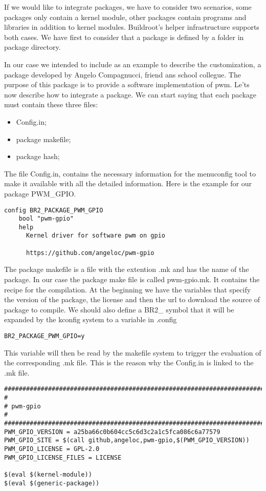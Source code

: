 \documentclass[a4paper,twoside,11pt]{article}
\begin{document}
If we would like to integrate packages,
we have to consider two scenarios, some packages only contain a kernel module, other packages contain programs and libraries in addition to kernel modules. 
Buildroot's helper infrastructure supports both cases.
We have first to consider that a package is defined by a folder in package directory.


In our case we intended to include as an example to describe the customization, a package developed by Angelo Compagnucci, friend ans school collegue.
The purpose of this package is to provide a software implementation of pwm.
Le'ts now describe how to integrate a package.
We can start saying that each package must contain these three files:
\begin{itemize}
\item Config.in;
\item package makefile;
\item package hash;
\end{itemize}
The file Config.in, contains the necessary information for the menuconfig tool to make it available with all the detailed information.
Here is the example for our package PWM\_GPIO. 
\begin{lstlisting}
config BR2_PACKAGE_PWM_GPIO
	bool "pwm-gpio"
	help
	  Kernel driver for software pwm on gpio

	  https://github.com/angeloc/pwm-gpio
\end{lstlisting}
The package makefile is a file with the extention .mk and has the name of the package.
In our case the package make file is called pwm-gpio.mk.
It contains the recipe for the compilation.	
At the beginning we have the variables that specify the version of the package, the license and then the url to download the source of package to compile.
We should also define a BR2\_\* symbol that it will be expanded by the kconfig system to a variable in .config 
\begin{lstlisting}
BR2_PACKAGE_PWM_GPIO=y
\end{lstlisting}
This variable will then be read by the makefile system to trigger the evaluation of the corresponding .mk file. 
This is the reason why the Config.in is linked to the .mk file.



\begin{lstlisting}
################################################################################
#
# pwm-gpio
#
################################################################################
PWM_GPIO_VERSION = a25ba66c0b604cc5c6d3c2a1c5fca086c6a77579
PWM_GPIO_SITE = $(call github,angeloc,pwm-gpio,$(PWM_GPIO_VERSION))
PWM_GPIO_LICENSE = GPL-2.0
PWM_GPIO_LICENSE_FILES = LICENSE

$(eval $(kernel-module))
$(eval $(generic-package))
\end{lstlisting}
\end{document}
